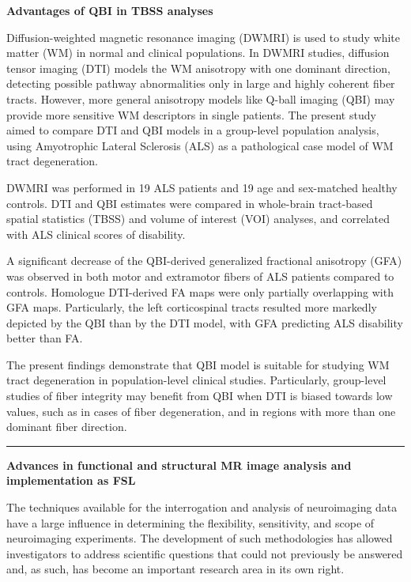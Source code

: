 \documentclass[12pt]{article}
\begin{document}
\textbf{Advantages of QBI in TBSS analyses}

\hfill

Diffusion-weighted magnetic resonance imaging (DWMRI) is used to study white matter (WM) in normal and 
clinical populations. In DWMRI studies, diffusion tensor imaging (DTI) models the WM anisotropy with one dominant direction, detecting possible pathway abnormalities only in large and highly coherent fiber tracts. However, more general anisotropy models like Q-ball imaging (QBI) may provide more sensitive WM descriptors in single patients. The present study aimed to compare DTI and QBI models in a group-level population analysis, using Amyotrophic Lateral Sclerosis (ALS) as a pathological case model of WM tract degeneration.

DWMRI was performed in 19 ALS patients and 19 age and sex-matched healthy controls. DTI and QBI estimates 
were compared in whole-brain tract-based spatial statistics (TBSS) and volume of interest (VOI) analyses, 
and correlated with ALS clinical scores of disability.

A significant decrease of the QBI-derived generalized fractional anisotropy (GFA) was observed in both 
motor and extramotor fibers of ALS patients compared to controls. Homologue DTI-derived FA maps were only 
partially overlapping with GFA maps. Particularly, the left corticospinal tracts resulted more markedly 
depicted by the QBI than by the DTI model, with GFA predicting ALS disability better than FA.

The present findings demonstrate that QBI model is suitable for studying WM tract degeneration in 
population-level clinical studies. Particularly, group-level studies of fiber integrity may benefit from 
QBI when DTI is biased towards low values, such as in cases of fiber degeneration, and in regions with more 
than one dominant fiber direction.

\par\rule{\textwidth}{0.5pt} 


\textbf{Advances in functional and structural MR image analysis and implementation as FSL}

\hfill

The techniques available for the interrogation and analysis of neuroimaging data have a large influence in 
determining the flexibility, sensitivity, and scope of neuroimaging experiments. The development of such 
methodologies has allowed investigators to address scientific questions that could not previously be 
answered and, as such, has become an important research area in its own right.
\end{document}
